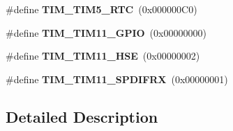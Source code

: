 \begin{DoxyCompactItemize}
\item 
\#define {\bfseries T\+I\+M\+\_\+\+T\+I\+M5\+\_\+\+R\+TC}~(0x000000\+C0)\hypertarget{group___t_i_m_ex___remap_ga93e312581ffb28601b36b4f8b240df79}{}\label{group___t_i_m_ex___remap_ga93e312581ffb28601b36b4f8b240df79}

\item 
\#define {\bfseries T\+I\+M\+\_\+\+T\+I\+M11\+\_\+\+G\+P\+IO}~(0x00000000)\hypertarget{group___t_i_m_ex___remap_gac8a0bac87924350651da1957081bc9ae}{}\label{group___t_i_m_ex___remap_gac8a0bac87924350651da1957081bc9ae}

\item 
\#define {\bfseries T\+I\+M\+\_\+\+T\+I\+M11\+\_\+\+H\+SE}~(0x00000002)\hypertarget{group___t_i_m_ex___remap_ga3b08e8165670e3034401099aada7712d}{}\label{group___t_i_m_ex___remap_ga3b08e8165670e3034401099aada7712d}

\item 
\#define {\bfseries T\+I\+M\+\_\+\+T\+I\+M11\+\_\+\+S\+P\+D\+I\+F\+RX}~(0x00000001)\hypertarget{group___t_i_m_ex___remap_ga4c5af0074a427706f65acb3f60c3def3}{}\label{group___t_i_m_ex___remap_ga4c5af0074a427706f65acb3f60c3def3}

\end{DoxyCompactItemize}


\subsection{Detailed Description}
